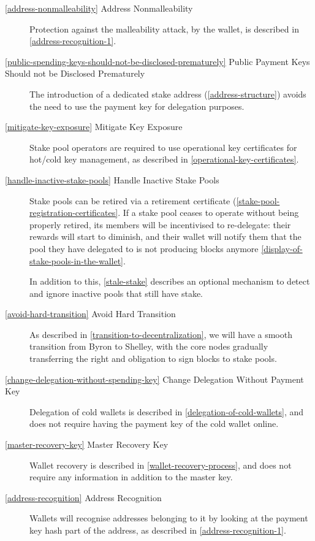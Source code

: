 \documentclass[11pt,a4paper,dvipsnames,twosided]{article}
\begin{document}
\begin{description}
\item[\cref{address-nonmalleability} Address Nonmalleability] Protection against
  the malleability attack, by the wallet, is described in
  \cref{address-recognition-1}.

\item[\cref{public-spending-keys-should-not-be-disclosed-prematurely}
  Public Payment Keys Should not be Disclosed Prematurely] The
  introduction of a dedicated stake address (\cref{address-structure})
  avoids the need to use the payment key for delegation purposes.

\item[\cref{mitigate-key-exposure} Mitigate Key Exposure] Stake pool operators
  are required to use operational key certificates for hot/cold key management,
  as described in \cref{operational-key-certificates}.

\item[\cref{handle-inactive-stake-pools} Handle Inactive Stake Pools]
  Stake pools can be retired via a retirement certificate
  (\cref{stake-pool-registration-certificates}. If a stake pool
  ceases to operate without being properly retired, its members will be
  incentivised to re-delegate: their rewards will start to diminish, and their
  wallet will notify them that the pool they have delegated to is not producing
  blocks anymore \cref{display-of-stake-pools-in-the-wallet}.

  In addition to this, \cref{stale-stake} describes an optional mechanism to
  detect and ignore inactive pools that still have stake.

\item[\cref{avoid-hard-transition} Avoid Hard Transition] As described
  in \cref{transition-to-decentralization}, we will have a smooth
  transition from Byron to Shelley, with the core nodes gradually
  transferring the right and obligation to sign blocks to stake pools.

\item[\cref{change-delegation-without-spending-key} Change Delegation
  Without Payment Key] Delegation of cold wallets is described in
  \cref{delegation-of-cold-wallets}, and does not require having the
  payment key of the cold wallet online.

\item[\cref{master-recovery-key} Master Recovery Key] Wallet recovery
  is described in \cref{wallet-recovery-process}, and does not require
  any information in addition to the master key.

\item[\cref{address-recognition} Address Recognition] Wallets will
  recognise addresses belonging to it by looking at the payment key
  hash part of the address, as described in
  \cref{address-recognition-1}.


\end{description}
\end{document}
